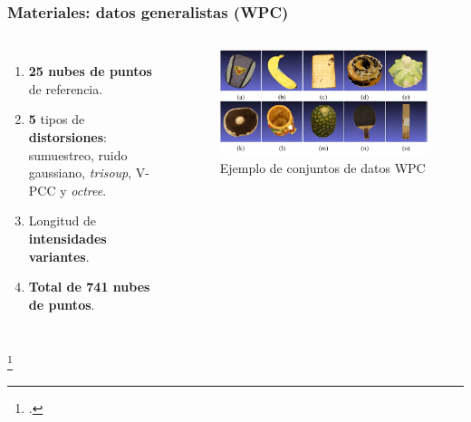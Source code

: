 \begin{frame}
    \frametitle{Materiales: datos generalistas (WPC)}
    \begin{columns}
      \begin{enumerate}
        \item \textbf{25 nubes de puntos} de referencia.  
        \item \textbf{5} tipos de \textbf{distorsiones}: 
          sumuestreo, ruido gaussiano, \emph{trisoup}, V-PCC y \emph{octree}.
        \item Longitud de \textbf{intensidades variantes}.
        \item \textbf{Total de 741 nubes de puntos}.
      \end{enumerate}
      \begin{figure}
        \includegraphics[width=.95\textwidth]{imagenes/chapter3/WPC}
        \caption{Ejemplo de conjuntos de datos WPC\footnotemark}
        \label{fig:WPC}
      \end{figure}
    \end{columns}
    \footcitetext{WPC1}
\end{frame}


